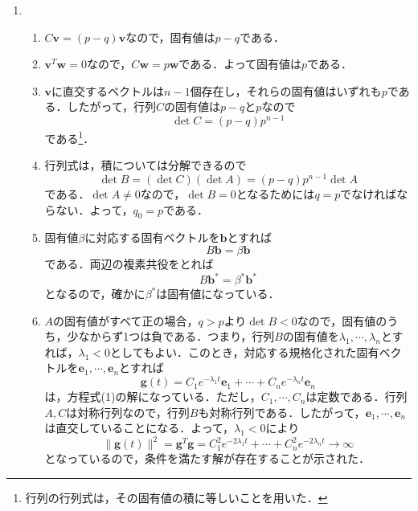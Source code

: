 \documentclass[a4paper,pdflatex,ja=standard]{bxjsarticle}
\begin{document}
\begin{enumerate}
  \item 
  \begin{enumerate}
    \item 
    $C\bm{v}=(p-q)\bm{v}$なので，固有値は$p-q$である．

    \item 
    $\bm{v}^{T}\bm{w}=0$なので，$C\bm{w}=p\bm{w}$である．よって固有値は$p$である．

    \item 
    $\bm{v}$に直交するベクトルは$n-1$個存在し，それらの固有値はいずれも$p$である．したがって，行列$C$の固有値は$p-q$と$p$なので
    \begin{equation}
      \det C
      =
      (p-q)p^{n-1}
    \end{equation}
    である\footnote{行列の行列式は，その固有値の積に等しいことを用いた．}．

    \item 
    行列式は，積については分解できるので
    \begin{equation}
      \det B
      =
      (\det C)(\det A)
      =
      (p-q)p^{n-1}\det A
    \end{equation}
    である．$\det A\neq 0$なので，$\det B=0$となるためには$q=p$でなければならない．よって，$q_0=p$である．

    \item 
    固有値$\beta$に対応する固有ベクトルを$\bm{b}$とすれば
    \begin{equation}
      B\bm{b}
      =
      \beta\bm{b}
    \end{equation}
    である．両辺の複素共役をとれば
    \begin{equation}
      B\bm{b}^{*}
      =
      \beta^{*}\bm{b}^{*}
    \end{equation}
    となるので，確かに$\beta^{*}$は固有値になっている．

    \item 
    $A$の固有値がすべて正の場合，$q>p$より$\det B<0$なので，固有値のうち，少なからず1つは負である．つまり，行列$B$の固有値を$\lambda_{1},\cdots,\lambda_{n}$とすれば，$\lambda_{1}<0$としてもよい．このとき，対応する規格化された固有ベクトルを$\bm{e}_{1},\cdots,\bm{e}_{n}$とすれば
    \begin{equation}
      \bm{g}(t)
      =
      C_{1}e^{-\lambda_{1} t}\bm{e}_{1}
      +
      \cdots
      +
      C_{n}e^{-\lambda_{n} t}\bm{e}_{n}
      \label{sol1}
    \end{equation}
    は，方程式(1)の解になっている．ただし，$C_{1},\cdots,C_{n}$は定数である．行列$A,C$は対称行列なので，行列$B$も対称行列である．したがって，$\bm{e}_{1},\cdots,\bm{e}_{n}$は直交していることになる．よって，$\lambda_{1}<0$により
    \begin{equation}
      \|\bm{g}(t)\|^2
      =
      \bm{g}^{T}\bm{g}
      =
      C_{1}^2 e^{-2\lambda_{1}t}
      +
      \cdots
      +
      C_{n}^2 e^{-2\lambda_{n}t}
      \rightarrow
      \infty
    \end{equation}
    となっているので，条件を満たす解が存在することが示された．


\end{enumerate}
\end{enumerate}
\end{document}
